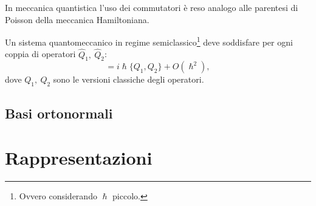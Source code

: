 In meccanica quantistica l'uso dei commutatori è reso analogo alle parentesi di Poisson della meccanica Hamiltoniana. 
\begin{principle}[di quantizazione]
    Un sistema quantomeccanico in regime semiclassico\footnote{Ovvero considerando $\hslash$ piccolo.} deve soddisfare per ogni coppia di operatori $\hat Q_1,\ \hat Q_2$:
    \begin{equation*}
    [\hat Q_1,\hat Q_2]=i\hslash\{Q_1,Q_2\}+O(\hslash^2),
    \end{equation*}
    dove $Q_1,\ Q_2$ sono le versioni classiche degli operatori.
\end{principle}
\subsection{Basi ortonormali}
\section{Rappresentazioni}
